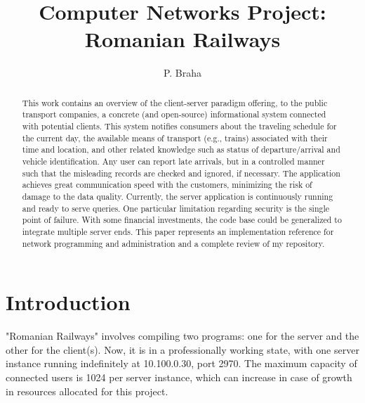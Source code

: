 \documentclass[runningheads]{llncs}
\begin{document}
\title{Computer Networks Project: \\ Romanian Railways}

\author{P. Braha}

\maketitle

\begin{abstract} This work contains an overview of the client-server paradigm offering, to the public transport companies, a concrete (and open-source) informational system connected with potential clients. This system notifies consumers about the traveling schedule for the current day, the available means of transport (e.g., trains) associated with their time and location, and other related knowledge such as status of departure/arrival and vehicle identification. Any user can report late arrivals, but in a controlled manner such that the misleading records are checked and ignored, if necessary. The application achieves great communication speed with the customers, minimizing the risk of damage to the data quality. Currently, the server application is continuously running and ready to serve queries. One particular limitation regarding security is the single point of failure. With some financial investments, the code base could be generalized to integrate multiple server ends. This paper represents an implementation reference for network programming and administration and a complete review of my repository.

\end{abstract}


\section{Introduction}

"Romanian Railways" involves compiling two programs: one for the server and the other for the client(s). Now, it is in a professionally working state, with one server instance running indefinitely at 10.100.0.30, port 2970. The maximum capacity of connected users is 1024 per server instance, which can increase in case of growth in resources allocated for this project.
\end{document}
